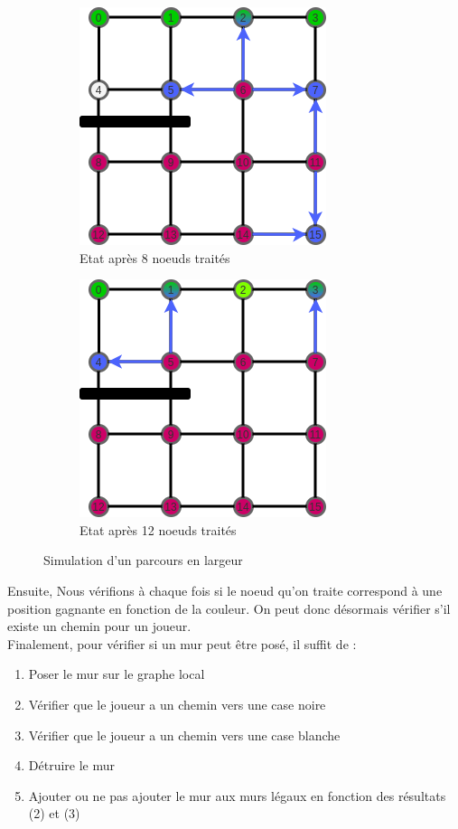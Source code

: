 \documentclass[a4paper]{article}
\begin{document}
\begin{figure}[ht]
    \begin{subfigure}[b]{.5\textwidth}
        \centering
        \includegraphics[scale=0.7]{parcours_graphe3.png}
        \caption{Etat après 8 noeuds traités}
        \label{fig:parcours_graphe3}
    \end{subfigure}%
    \begin{subfigure}[b]{.5\textwidth}
        \centering
        \includegraphics[scale=0.7]{parcours_graphe4.png}
        \caption{Etat après 12 noeuds traités}
        \label{fig:parcours_graphe4}
    \end{subfigure}%

    \caption{Simulation d'un parcours en largeur}
    \label{fig:parcours_graphe}
\end{figure}




Ensuite, Nous vérifions à chaque fois si le noeud qu'on traite correspond à une position gagnante en fonction de la couleur. On peut donc désormais vérifier s'il existe un chemin pour un joueur. \\

Finalement, pour vérifier si un mur peut être posé, il suffit de :
\begin{enumerate}
    \item Poser le mur sur le graphe local
    \item Vérifier que le joueur  a un chemin vers une case noire
    \item Vérifier que le joueur  a un chemin vers une case blanche
    \item Détruire le mur
    \item Ajouter ou ne pas ajouter le mur aux murs légaux en fonction des résultats (2) et (3) \\
\end{enumerate}
\end{document}
